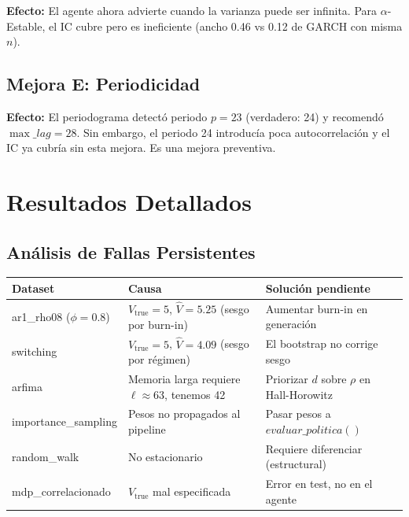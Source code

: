 \documentclass[12pt,a4paper]{article}
\begin{document}
\textbf{Efecto:} El agente ahora advierte cuando la varianza puede ser infinita. Para $\alpha$-Estable, el IC cubre pero es ineficiente (ancho 0.46 vs 0.12 de GARCH con misma $n$).

\subsection{Mejora E: Periodicidad}

\textbf{Efecto:} El periodograma detectó periodo $p=23$ (verdadero: 24) y recomendó $\max\_lag=28$. Sin embargo, el periodo 24 introducía poca autocorrelación y el IC ya cubría sin esta mejora. Es una mejora preventiva.

\newpage

\section{Resultados Detallados}



\subsection{Análisis de Fallas Persistentes}

\begin{longtable}{@{}lll@{}}
	\toprule
	Dataset                 & Causa                                                   & Solución pendiente                          \\
	\midrule
	\endhead
	ar1\_rho08 ($\phi=0.8$) & $V_{\text{true}}=5$, $\hat{V}=5.25$ (sesgo por burn-in) & Aumentar burn-in en generación              \\
	switching               & $V_{\text{true}}=5$, $\hat{V}=4.09$ (sesgo por régimen) & El bootstrap no corrige sesgo               \\
	arfima                  & Memoria larga requiere $\ell\approx63$, tenemos 42      & Priorizar $d$ sobre $\rho$ en Hall-Horowitz \\
	importance\_sampling    & Pesos no propagados al pipeline                         & Pasar pesos a $evaluar\_politica()$         \\
	random\_walk            & No estacionario                                         & Requiere diferenciar (estructural)          \\
	mdp\_correlacionado     & $V_{\text{true}}$ mal especificada                      & Error en test, no en el agente              \\
	\bottomrule
\end{longtable}
\end{document}
